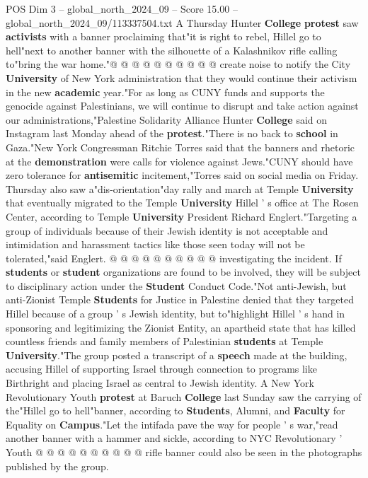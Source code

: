 \begin{textsample}{POS Dim 3 – global\_north\_2024\_09 – Score 15.00 – global\_north\_2024\_09/113337504.txt}
A Thursday Hunter \textbf{College} \textbf{protest} saw \textbf{activists} with a banner proclaiming that"it is right to rebel, Hillel go to hell"next to another banner with the silhouette of a Kalashnikov rifle calling to"bring the war home."@ @ @ @ @ @ @ @ @ @ create noise to notify the City \textbf{University} of New York administration that they would continue their activism in the new \textbf{academic} year."For as long as CUNY funds and supports the genocide against Palestinians, we will continue to disrupt and take action against our administrations,"Palestine Solidarity Alliance Hunter \textbf{College} said on Instagram last Monday ahead of the \textbf{protest}."There is no back to \textbf{school} in Gaza."New York Congressman Ritchie Torres said that the banners and rhetoric at the \textbf{demonstration} were calls for violence against Jews."CUNY should have zero tolerance for \textbf{antisemitic} incitement,"Torres said on social media on Friday.
Thursday also saw a"dis-orientation"day rally and march at Temple \textbf{University} that eventually migrated to the Temple \textbf{University} Hillel ' s office at The Rosen Center, according to Temple \textbf{University} President Richard Englert."Targeting a group of individuals because of their Jewish identity is not acceptable and intimidation and harassment tactics like those seen today will not be tolerated,"said Englert. @ @ @ @ @ @ @ @ @ @ investigating the incident.
If \textbf{students} or \textbf{student} organizations are found to be involved, they will be subject to disciplinary action under the \textbf{Student} Conduct Code."Not anti-Jewish, but anti-Zionist Temple \textbf{Students} for Justice in Palestine denied that they targeted Hillel because of a group ' s Jewish identity, but to"highlight Hillel ' s hand in sponsoring and legitimizing the Zionist Entity, an apartheid state that has killed countless friends and family members of Palestinian \textbf{students} at Temple \textbf{University}."The group posted a transcript of a \textbf{speech} made at the building, accusing Hillel of supporting Israel through connection to programs like Birthright and placing Israel as central to Jewish identity.
A New York Revolutionary Youth \textbf{protest} at Baruch \textbf{College} last Sunday saw the carrying of the"Hillel go to hell"banner, according to \textbf{Students}, Alumni, and \textbf{Faculty} for Equality on \textbf{Campus}."Let the intifada pave the way for people ' s war,"read another banner with a hammer and sickle, according to NYC Revolutionary ' Youth @ @ @ @ @ @ @ @ @ @ rifle banner could also be seen in the photographs published by the group.

\end{textsample}
